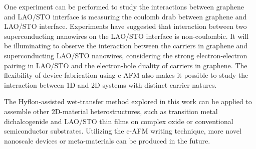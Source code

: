 \documentclass[pdflatex, sectionletters, 12pt]{pittetd}    %
\begin{document}
One experiment can be performed to study the interactions between graphene and LAO/STO interface is measuring the coulomb drab between graphene and LAO/STO interface. Experiments have suggested that interaction between two superconducting nanowires on the LAO/STO interface is non-coulombic\cite{tang2017non}. It will be illuminating to observe the interaction between the carriers in graphene and superconducting LAO/STO nanowires, considering the strong electron-electron pairing in LAO/STO and the electron-hole duality of carriers in graphene. The flexibility of device fabrication using c-AFM also makes it possible to study the interaction between 1D and 2D systems with distinct carrier natures.

The Hyflon-assisted wet-transfer method explored in this work can be applied to assemble other 2D-material heterostructures, such as transition metal dichalcogenide and LAO/STO thin films on complex oxide or conventional semiconductor substrates. Utilizing the c-AFM writing technique, more novel nanoscale devices or meta-materials can be produced in the future.

%
%

% 

\end{document}
